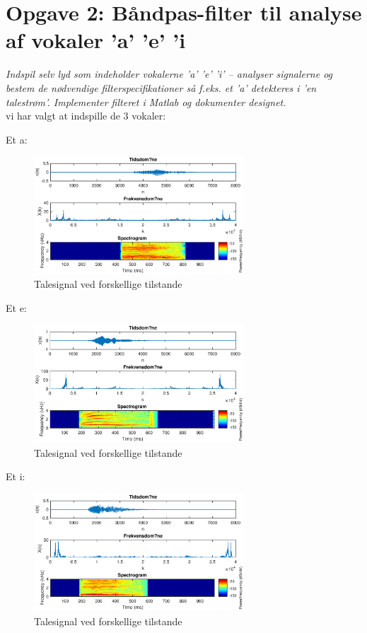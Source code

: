 \documentclass[a4paper]{report}
\begin{document}
\section*{Opgave 2: Båndpas-filter til analyse af vokaler ’a’  ’e’  ’i}
\textit{Indspil selv lyd som indeholder vokalerne ’a’  ’e’  ’i’ – analyser signalerne og bestem de nødvendige filterspecifikationer så f.eks. et ’a’ detekteres i ’en talestrøm’. Implementer filteret i Matlab og dokumenter designet.}\\


vi har valgt at indspille de 3 vokaler: 

Et a: 

\begin{figure}[H] 
\centering
\includegraphics[width=0.7\textwidth]{grafer/opg2_a}
\caption{Talesignal ved forskellige tilstande} \label{opg2_a}
\end{figure}

Et e: 
\begin{figure}[H] 
\centering
\includegraphics[width=0.7\textwidth]{grafer/opg2_e}
\caption{Talesignal ved forskellige tilstande} \label{opg2_e}
\end{figure}

Et i: 
\begin{figure}[H] 
\centering
\includegraphics[width=0.7\textwidth]{grafer/opg2_i}
\caption{Talesignal ved forskellige tilstande} \label{opg2_i}
\end{figure}
\end{document}
